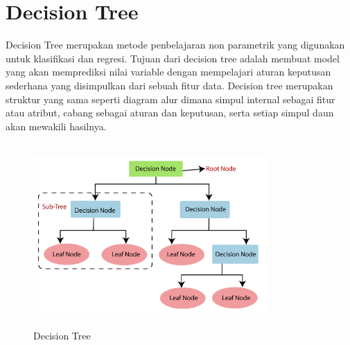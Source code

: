 	\section{Decision Tree}
	Decision Tree merupakan metode penbelajaran non parametrik yang digunakan untuk klasifikasi dan regresi. Tujuan dari decision tree adalah membuat model yang akan memprediksi nilai variable dengan mempelajari aturan keputusan sederhana yang disimpulkan dari sebuah fitur data. Decision tree merupakan struktur yang sama seperti diagram alur dimana simpul internal sebagai fitur atau atribut, cabang sebagai aturan dan keputusan, serta setiap simpul daun akan mewakili hasilnya.
	\begin{figure}[!htbp]
		\centering
		\includegraphics[width=9cm,height=7cm]{figures/Cp2-DecisionTree.png}
		\caption{Decision Tree}
		\label{penanda}
	\end{figure}

